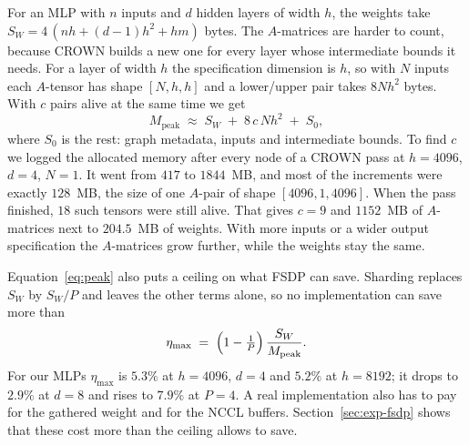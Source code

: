 \documentclass[runningheads]{llncs}
\begin{document}
For an MLP with $n$ inputs and $d$ hidden layers of width $h$, the weights take
$S_W = 4\,(nh + (d{-}1)h^2 + hm)$ bytes. The $A$-matrices are harder to count,
because CROWN builds a new one for every layer whose intermediate bounds it
needs. For a layer of width $h$ the specification dimension is $h$, so with $N$
inputs each $A$-tensor has shape $[N, h, h]$ and a lower/upper pair takes
$8Nh^2$ bytes. With $c$ pairs alive at the same time we get
\begin{equation}
  M_\text{peak} \;\approx\; S_W \;+\; 8\,c\,N h^2 \;+\; S_0 ,
  \label{eq:peak}
\end{equation}
where $S_0$ is the rest: graph metadata, inputs and intermediate bounds. To find
$c$ we logged the allocated memory after every node of a CROWN pass at
$h{=}4096$, $d{=}4$, $N{=}1$. It went from $417$ to $1844$~MB, and most of the
increments were exactly $128$~MB, the size of one $A$-pair of shape
$[4096,1,4096]$. When the pass finished, $18$ such tensors were still alive.
That gives $c{=}9$ and $1152$~MB of $A$-matrices next to $204.5$~MB of weights.
With more inputs or a wider output specification the $A$-matrices grow further,
while the weights stay the same.

Equation~\ref{eq:peak} also puts a ceiling on what FSDP can save. Sharding
replaces $S_W$ by $S_W/P$ and leaves the other terms alone, so no implementation
can save more than
\begin{equation}
  \eta_\text{max} \;=\; \Bigl(1 - \tfrac{1}{P}\Bigr)\,
  \frac{S_W}{M_\text{peak}} .
  \label{eq:ceiling}
\end{equation}
For our MLPs $\eta_\text{max}$ is $5.3\%$ at $h{=}4096$, $d{=}4$ and $5.2\%$ at
$h{=}8192$; it drops to $2.9\%$ at $d{=}8$ and rises to $7.9\%$ at $P{=}4$. A
real implementation also has to pay for the gathered weight and for the NCCL
buffers. Section~\ref{sec:exp-fsdp} shows that these cost more than the ceiling
allows to save.
\end{document}
